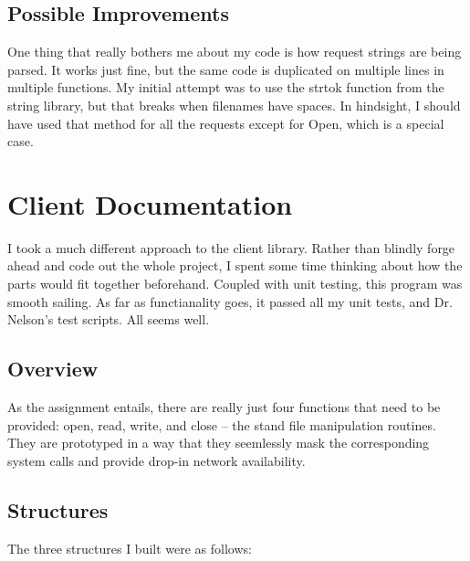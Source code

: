 \documentclass[a4paper,12pt]{article}
\begin{document}
\subsection{Possible Improvements}
One thing that really bothers me about my code is how request strings
are being parsed. It works just fine, but the same code is duplicated
on multiple lines in multiple functions. My initial attempt was to use
the strtok function from the string library, but that breaks when
filenames have spaces. In hindsight, I should have used that method
for all the requests except for Open, which is a special case.

\section{Client Documentation}
I took a much different approach to the client library. Rather than
blindly forge ahead and code out the whole project, I spent some time
thinking about how the parts would fit together beforehand. Coupled
with unit testing, this program was smooth sailing. As far as
functianality goes, it passed all my unit tests, and Dr. Nelson's test
scripts. All seems well.

\subsection{Overview}
As the assignment entails, there are really just four functions that
need to be provided: open, read, write, and close -- the stand file
manipulation routines. They are prototyped in a way that they
seemlessly mask the corresponding system calls and provide drop-in
network availability.

\subsection{Structures}
The three structures I built were as follows:
\end{document}
